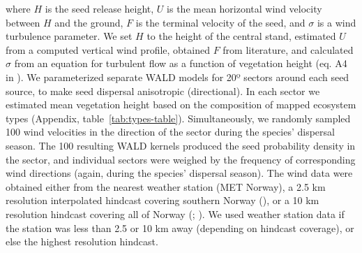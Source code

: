 \documentclass[
]{article}
\begin{document}
where \(H\) is the seed release height, \(U\) is the mean horizontal wind velocity
between \(H\) and the ground, \(F\) is the terminal velocity of the seed, and
\(\sigma\) is a wind turbulence parameter. We set \(H\) to the height of the central
stand, estimated \(U\) from a computed vertical wind profile, obtained \(F\) from
literature, and calculated \(\sigma\) from an equation for turbulent flow as a
function of vegetation height (eq. A4 in ). We parameterized separate WALD models
for 20º sectors around each seed source, to make seed dispersal anisotropic
(directional). In each sector we estimated mean vegetation height based on the
composition of mapped ecosystem types (Appendix, table~\ref{tab:types-table}).
Simultaneously, we randomly sampled 100 wind velocities in the direction of the
sector during the species' dispersal season. The 100 resulting WALD kernels
produced the seed probability density in the sector, and individual sectors were
weighed by the frequency of corresponding wind directions (again, during the
species' dispersal season). The wind data were obtained either from the nearest
weather station (MET Norway), a 2.5 km resolution interpolated hindcast covering
southern Norway (), or a 10 km resolution
hindcast covering all of Norway (; ). We used weather station data if the
station was less than 2.5 or 10 km away (depending on hindcast coverage), or
else the highest resolution hindcast.

\newpage
\end{document}
